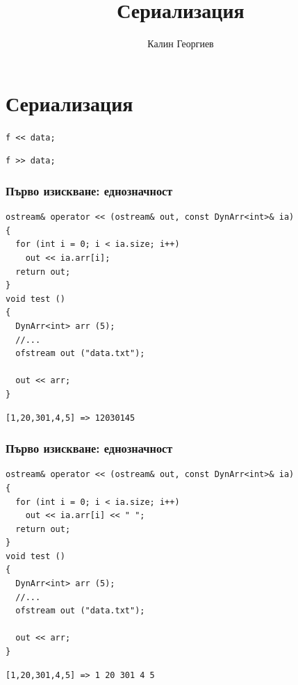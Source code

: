 \documentclass{beamer}
\begin{document}
\title[Обектно ориентирано програмиране]{Сериализация} 
\author{Калин Георгиев} 
\frame{\titlepage} 

\section{Сериализация} 

\begin{frame}
\centerline{\texttt{f << data;}}
\centerline{\texttt{f >> data;}}
\end{frame}




\begin{frame}[fragile]
\frametitle{Първо изискване: еднозначност}

\begin{flushleft}
\begin{lstlisting}
ostream& operator << (ostream& out, const DynArr<int>& ia)
{
  for (int i = 0; i < ia.size; i++)
    out << ia.arr[i];
  return out;
}
void test ()
{
  DynArr<int> arr (5);
  //...
  ofstream out ("data.txt");

  out << arr;
}
\end{lstlisting}  
\end{flushleft}

\begin{lstlisting}
[1,20,301,4,5] => 12030145
\end{lstlisting}  

\end{frame}


\begin{frame}[fragile]
\frametitle{Първо изискване: еднозначност}

\begin{flushleft}
\begin{lstlisting}
ostream& operator << (ostream& out, const DynArr<int>& ia)
{
  for (int i = 0; i < ia.size; i++)
    out << ia.arr[i] << " ";
  return out;
}
void test ()
{
  DynArr<int> arr (5);
  //...
  ofstream out ("data.txt");

  out << arr;
}
\end{lstlisting}  
\end{flushleft}

\begin{lstlisting}
[1,20,301,4,5] => 1 20 301 4 5
\end{lstlisting}  

\end{frame}
\end{document}
